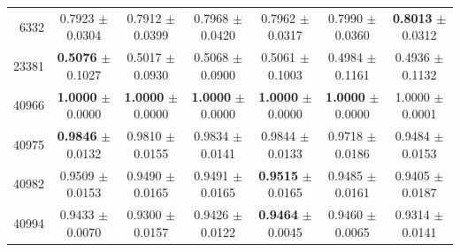 \begin{table}[t]
\begin{tabular*}{\textwidth}{@{\extracolsep{\fill}}rcccccc@{}}
6332 & 0.7923 $\pm$ 0.0304 & 0.7912 $\pm$ 0.0399 & 0.7968 $\pm$ 0.0420 & 0.7962 $\pm$ 0.0317 & 0.7990 $\pm$ 0.0360 & \textbf{0.8013} $\pm$ 0.0312 \\
23381 & \textbf{0.5076} $\pm$ 0.1027 & 0.5017 $\pm$ 0.0930 & 0.5068 $\pm$ 0.0900 & 0.5061 $\pm$ 0.1003 & 0.4984 $\pm$ 0.1161 & 0.4936 $\pm$ 0.1132 \\
40966 & \textbf{1.0000} $\pm$ 0.0000 & \textbf{1.0000} $\pm$ 0.0000 & \textbf{1.0000} $\pm$ 0.0000 & \textbf{1.0000} $\pm$ 0.0000 & \textbf{1.0000} $\pm$ 0.0000 & 1.0000 $\pm$ 0.0001 \\
40975 & \textbf{0.9846} $\pm$ 0.0132 & 0.9810 $\pm$ 0.0155 & 0.9834 $\pm$ 0.0141 & 0.9844 $\pm$ 0.0133 & 0.9718 $\pm$ 0.0186 & 0.9484 $\pm$ 0.0153 \\
40982 & 0.9509 $\pm$ 0.0153 & 0.9490 $\pm$ 0.0165 & 0.9491 $\pm$ 0.0165 & \textbf{0.9515} $\pm$ 0.0165 & 0.9485 $\pm$ 0.0161 & 0.9405 $\pm$ 0.0187 \\
40994 & 0.9433 $\pm$ 0.0070 & 0.9300 $\pm$ 0.0157 & 0.9426 $\pm$ 0.0122 & \textbf{0.9464} $\pm$ 0.0045 & 0.9460 $\pm$ 0.0065 & 0.9314 $\pm$ 0.0141 \\
\bottomrule
\end{tabular*}
\end{table}
